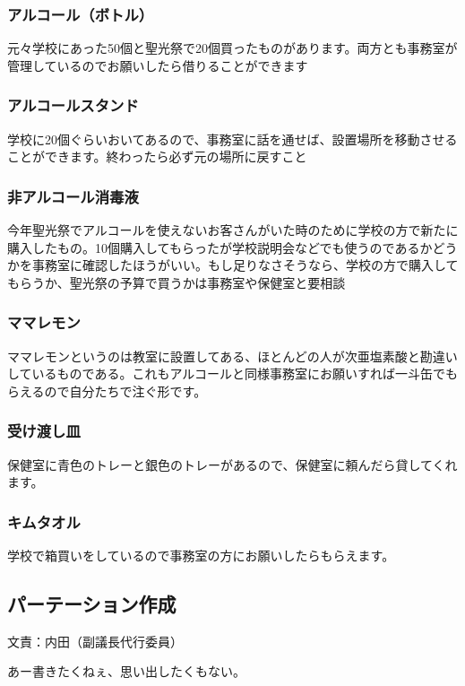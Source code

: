 \documentclass[a4paper]{ltjsreport}
\begin{document}
\subsubsection{アルコール（ボトル）}
元々学校にあった50個と聖光祭で20個買ったものがあります。両方とも事務室が管理しているのでお願いしたら借りることができます

\subsubsection{アルコールスタンド}
学校に20個ぐらいおいてあるので、事務室に話を通せば、設置場所を移動させることができます。終わったら必ず元の場所に戻すこと

\subsubsection{非アルコール消毒液}
今年聖光祭でアルコールを使えないお客さんがいた時のために学校の方で新たに購入したもの。10個購入してもらったが学校説明会などでも使うのであるかどうかを事務室に確認したほうがいい。もし足りなさそうなら、学校の方で購入してもらうか、聖光祭の予算で買うかは事務室や保健室と要相談

\subsubsection{ママレモン}
ママレモンというのは教室に設置してある、ほとんどの人が次亜塩素酸と勘違いしているものである。これもアルコールと同様事務室にお願いすれば一斗缶でもらえるので自分たちで注ぐ形です。

\subsubsection{受け渡し皿}
保健室に青色のトレーと銀色のトレーがあるので、保健室に頼んだら貸してくれます。

\subsubsection{キムタオル}
学校で箱買いをしているので事務室の方にお願いしたらもらえます。

\subsection{パーテーション作成} 文責：内田（副議長代行委員） \vspace{2mm}

あー書きたくねぇ、思い出したくもない。
\end{document}
